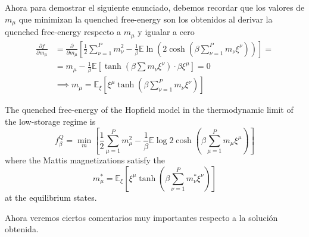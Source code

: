 \noindent
Ahora para demostrar el siguiente enunciado, debemos recordar que los valores de $m_{\mu}$ que minimizan la quenched free-energy son los obtenidos al derivar la quenched free-energy respecto a $m_{\mu}$ y igualar a cero
\begin{align*}
    \frac{\partial f}{\partial m_\mu} &= \frac{\partial}{\partial m_\mu} \left[ \frac{1}{2} \sum_{\nu=1}^P m_\nu^2 - \frac{1}{\beta} \mathbb{E} \ln \left( 2 \cosh \left( \beta \sum_{\nu=1}^P m_\nu \xi^\nu \right) \right) \right] = \\
    & =m_{\mu}-\frac{1}{\beta} \mathbb{E} \left[ \tanh \left( \beta \sum m_\nu \xi^\nu \right) \cdot \beta \xi^\mu \right] = 0 \\
    & \implies m_{\mu} = \mathbb{E}_{\xi} \left[ \xi^{\mu} \tanh \left( \beta \sum_{\nu=1}^P m_{\nu} \xi^{\nu} \right) \right]
\end{align*}
\begin{teo}
    The quenched free-energy of the Hopfield model in the thermodynamic limit of
    the low-storage regime is
    \begin{equation*}
        f_{\beta}^Q = \min_{m} \left[ \dfrac{1}{2} \sum_{\mu=1}^P m_{\mu}^2 - \dfrac{1}{\beta} \mathbb{E} \log 2 \cosh\left( \beta \sum_{\mu=1}^P m_{\mu} \xi^{\mu} \right) \right]
    \end{equation*}
    where the Mattis magnetizations satisfy the 
    \begin{equation*}
        m_{\mu}^* = \mathbb{E}_{\xi} \left[ \xi^{\mu} \tanh \left( \beta \sum_{\nu=1}^P m_{\nu}^* \xi^{\nu} \right) \right]
    \end{equation*}
    at the equilibrium states.
\end{teo}
\noindent
Ahora veremos ciertos comentarios muy importantes respecto a la solución obtenida.
